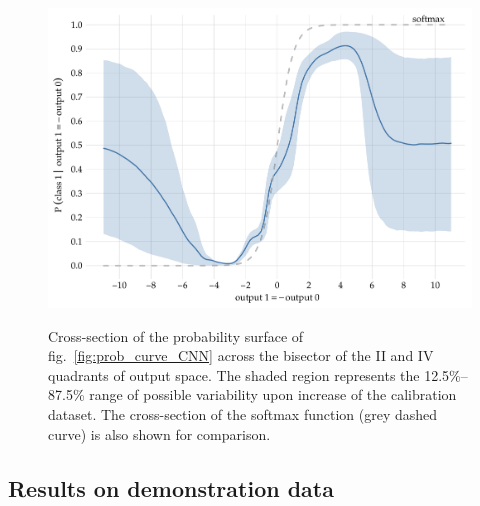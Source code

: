 \documentclass[\ifafour a4paper,12pt,\else a5paper,10pt,\fi%
onecolumn,oneside,article,%
british%
]{memoir}
\theoremstyle{remark}
\theoremstyle{innote}
\renewcommand*{\|}[1][]{\nonscript\:#1\vert\nonscript\:\mathopen{}}
\newcommand*{\fig}{fig.}%
\begin{document}
%
\begin{figure}[!t]
  \centering
  \includegraphics[width=\linewidth]{transducer_curve_diagonal_CNN_prob_softmax.pdf}\\
  \caption{Cross-section of the probability surface of \fig~\ref{fig:prob_curve_CNN} across the bisector of the II and IV quadrants of output space. The shaded region represents the 12.5\%--87.5\% range of possible variability upon increase of the calibration dataset. The cross-section of the softmax function (\textcolor{mygray}{grey dashed curve}) is also shown for comparison.}
  \label{fig:prob_curve_CNN_section}
\end{figure}



\subsection{Results on demonstration data}
\label{sec:demo_evaluation}
\end{document}
